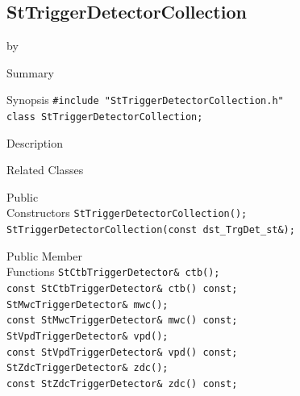 \documentclass[twoside]{article}
\newcommand{\entrylabel}[1]{\mbox{\textbf{{#1}}}\hfil}%
\newenvironment{entry}
{\begin{list}{}%
    {\renewcommand{\makelabel}{\entrylabel}%
     \setlength{\labelwidth}{90pt}%
     \setlength{\leftmargin}{\labelwidth}
     \advance\leftmargin by \labelsep%
      }%
    }%
  {\end{list}}
\newcommand{\Entrylabel}[1]%
{\raisebox{0pt}[1ex][0pt]{\makebox[\labelwidth][l]%
    {\parbox[t]{\labelwidth}{\hspace{0pt}\textbf{{#1}}}}}}
\newenvironment{Entry}%
{\renewcommand{\entrylabel}{\Entrylabel}\begin{entry}}%
  {\end{entry}}
\begin{document}
\subsection{StTriggerDetectorCollection}
\label{sec:StTriggerDetectorCollection}
\begin{Entry}
\item[Summary]
\item[Synopsis]
    \verb+#include "StTriggerDetectorCollection.h"+\\
    \verb+class StTriggerDetectorCollection;+\\
\item[Description]
\item[Related Classes]
\item[Public\\ Constructors]
    \verb+StTriggerDetectorCollection();+\\
    \verb+StTriggerDetectorCollection(const dst_TrgDet_st&);+\\
\item[Public Member\\ Functions]
    \verb+StCtbTriggerDetector& ctb();+\\
    \verb+const StCtbTriggerDetector& ctb() const;+\\
    \verb+StMwcTriggerDetector& mwc();+\\
    \verb+const StMwcTriggerDetector& mwc() const;+\\
    \verb+StVpdTriggerDetector& vpd();+\\
    \verb+const StVpdTriggerDetector& vpd() const;+\\
    \verb+StZdcTriggerDetector& zdc();+\\
    \verb+const StZdcTriggerDetector& zdc() const;+\\
\end{Entry}
\clearpage
\end{document}
